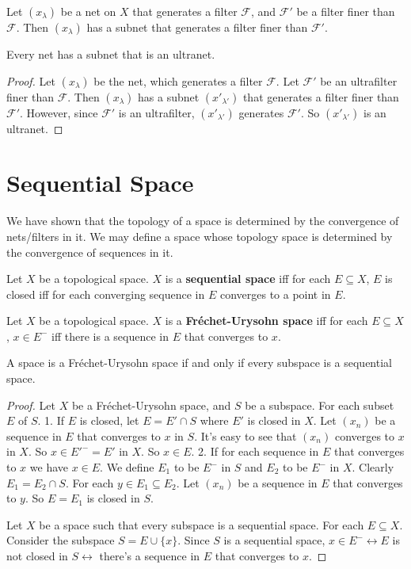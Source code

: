 \documentclass[12pt]{book}
\begin{document}
\begin{corollary}
	Let $(x_\lambda)$ be a net on $X$ that generates a filter $\mathcal F$, and $\mathcal F'$ be a filter finer than $\mathcal F$. Then $(x_\lambda)$ has a subnet that generates a filter finer than $\mathcal F'$.
\end{corollary}

\begin{corollary}[Kelley]
	Every net has a subnet that is an ultranet.
\end{corollary}
\begin{proof}
	Let $(x_\lambda)$ be the net, which generates a filter $\mathcal F$. Let $\mathcal F'$ be an ultrafilter finer than $\mathcal F$. Then $(x_\lambda)$ has a subnet $(x'_{\lambda'})$ that generates a filter finer than $\mathcal F'$. However, since $\mathcal F'$ is an ultrafilter, $(x'_{\lambda'})$ generates $\mathcal F'$. So $(x'_{\lambda'})$ is an ultranet.
\end{proof}
\section{Sequential Space}

We have shown that the topology of a space is determined by the convergence of nets/filters in it. We may define a space whose topology space is determined by the convergence of sequences in it.

\begin{definition}
	Let $X$ be a topological space. $X$ is a {\bf sequential space} iff for each $E\subseteq X$, $E$ is closed iff for each converging sequence in $E$ converges to a point in $E$.
\end{definition}

\begin{definition}
	Let $X$ be a topological space. $X$ is a {\bf Fr\'echet-Urysohn space} iff for each $E\subseteq X$, $x\in E^-$ iff there is a sequence in $E$ that converges to $x$.
\end{definition}
\begin{theorem}
	A space is a Fr\'echet-Urysohn space if and only if every subspace is a sequential space.
\end{theorem}
\begin{proof}
	Let $X$ be a Fr\'echet-Urysohn space, and $S$ be a subspace. For each subset $E$ of $S$. 1. If $E$ is closed, let $E=E'\cap S$ where $E'$ is closed in $X$. Let $(x_n)$ be a sequence in $E$ that converges to $x$ in $S$. It's easy to see that $(x_n)$ converges to $x$ in $X$. So $x\in E'^-=E'$ in $X$. So $x\in E$. 2. If for each sequence in $E$ that converges to $x$ we have $x\in E$. We define $E_1$ to be $E^-$ in $S$ and $E_2$ to be $E^-$ in $X$. Clearly $E_1=E_2\cap S$. For each $y\in E_1\subseteq E_2$. Let $(x_n)$ be a sequence in $E$ that converges to $y$. So $E=E_1$ is closed in $S$.
	
	Let $X$ be a space such that every subspace is a sequential space. For each $E\subseteq X$. Consider the subspace $S=E\cup\{x\}$. Since $S$ is a sequential space, $x\in E^-\leftrightarrow E$ is not closed in $S\leftrightarrow$ there's a sequence in $E$ that converges to $x$.
\end{proof}
\end{document}
